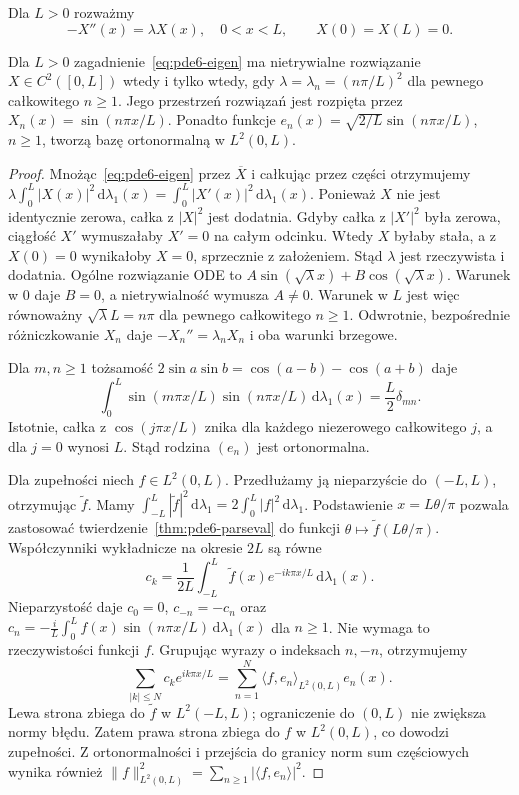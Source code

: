 Dla $L>0$ rozważmy
\begin{equation}\label{eq:pde6-eigen}
 -X''(x)=\lambda X(x),\quad 0<x<L,\qquad X(0)=X(L)=0.
\end{equation}
\begin{twierdzenie}
\label{thm:pde6-spectrum}
Dla $L>0$ zagadnienie~\eqref{eq:pde6-eigen} ma
nietrywialne rozwiązanie $X\in C^2([0,L])$
wtedy i tylko wtedy, gdy
$\lambda=\lambda_n=(n\pi/L)^2$ dla pewnego całkowitego $n\ge1$.
Jego przestrzeń rozwiązań jest rozpięta przez
$X_n(x)=\sin(n\pi x/L)$. Ponadto funkcje
$e_n(x)=\sqrt{2/L}\sin(n\pi x/L)$, $n\ge1$,
tworzą bazę ortonormalną w $L^2(0,L)$.
\end{twierdzenie}
\begin{proof}
Mnożąc~\eqref{eq:pde6-eigen} przez $\overline X$
i całkując przez części otrzymujemy
$\lambda\int_0^L|X(x)|^2\,\mathrm d\lambda_1(x)
=\int_0^L|X'(x)|^2\,\mathrm d\lambda_1(x)$.
Ponieważ $X$ nie jest identycznie zerowa, całka z $|X|^2$
jest dodatnia. Gdyby całka z $|X'|^2$ była zerowa,
ciągłość $X'$ wymuszałaby $X'=0$ na całym odcinku.
Wtedy $X$ byłaby stała, a z $X(0)=0$ wynikałoby $X=0$,
sprzecznie z założeniem. Stąd $\lambda$ jest rzeczywista
i dodatnia. Ogólne rozwiązanie ODE to
$A\sin(\sqrt\lambda x)+B\cos(\sqrt\lambda x)$.
Warunek w $0$ daje $B=0$, a nietrywialność wymusza $A\ne0$.
Warunek w $L$ jest więc równoważny
$\sqrt\lambda L=n\pi$ dla pewnego całkowitego $n\ge1$.
Odwrotnie, bezpośrednie różniczkowanie $X_n$ daje
$-X_n''=\lambda_n X_n$ i oba warunki brzegowe.

Dla $m,n\ge1$ tożsamość
$2\sin a\sin b=\cos(a-b)-\cos(a+b)$ daje
\[
 \int_0^L\sin(m\pi x/L)\sin(n\pi x/L)\,
 \mathrm d\lambda_1(x)=\frac L2\delta_{mn}.
\]
Istotnie, całka z $\cos(j\pi x/L)$ znika dla każdego
niezerowego całkowitego $j$, a dla $j=0$ wynosi $L$.
Stąd rodzina $(e_n)$ jest ortonormalna.

Dla zupełności niech $f\in L^2(0,L)$. Przedłużamy ją
nieparzyście do $(-L,L)$, otrzymując $\widetilde f$.
Mamy $\int_{-L}^L|\widetilde f|^2\,\mathrm d\lambda_1
=2\int_0^L|f|^2\,\mathrm d\lambda_1$.
Podstawienie $x=L\theta/\pi$ pozwala zastosować
twierdzenie~\ref{thm:pde6-parseval} do funkcji
$\theta\mapsto\widetilde f(L\theta/\pi)$.
Współczynniki wykładnicze na okresie $2L$ są równe
\[
 c_k=\frac1{2L}\int_{-L}^L\widetilde f(x)
 e^{-ik\pi x/L}\,\mathrm d\lambda_1(x).
\]
Nieparzystość daje $c_0=0$, $c_{-n}=-c_n$ oraz
$c_n=-\frac{i}{L}\int_0^Lf(x)\sin(n\pi x/L)\,
\mathrm d\lambda_1(x)$ dla $n\ge1$.
Nie wymaga to rzeczywistości funkcji $f$.
Grupując wyrazy o indeksach $n,-n$, otrzymujemy
\[
 \sum_{|k|\le N}c_ke^{ik\pi x/L}
 =\sum_{n=1}^N\langle f,e_n\rangle_{L^2(0,L)}e_n(x).
\]
Lewa strona zbiega do $\widetilde f$ w $L^2(-L,L)$;
ograniczenie do $(0,L)$ nie zwiększa normy błędu.
Zatem prawa strona zbiega do $f$ w $L^2(0,L)$,
co dowodzi zupełności. Z ortonormalności i przejścia
do granicy norm sum częściowych wynika również
$\|f\|_{L^2(0,L)}^2=\sum_{n\ge1}|\langle f,e_n\rangle|^2$.
\end{proof}

